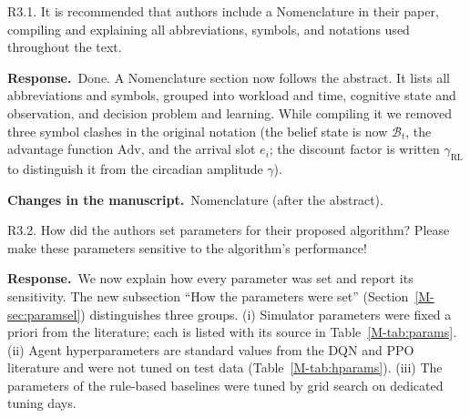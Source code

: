 \documentclass[11pt]{article}
\newcommand{\resp}{\par\smallskip\noindent\textbf{Response.}~}
\newcommand{\change}{\par\smallskip\noindent\textbf{Changes in the manuscript.}~}
\newcommand{\Sec}[1]{Section~\ref{M-#1}}
\newcommand{\Tab}[1]{Table~\ref{M-#1}}
\begin{document}
\begin{rcomment}{R3.1.}
It is recommended that authors include a Nomenclature in their paper, compiling and explaining all abbreviations, symbols, and notations used throughout the text.
\end{rcomment}
\resp Done. A Nomenclature section now follows the abstract. It lists all abbreviations and symbols, grouped into workload and time, cognitive state and observation, and decision problem and learning. While compiling it we removed three symbol clashes in the original notation (the belief state is now $\mathcal B_t$, the advantage function $\mathrm{Adv}$, and the arrival slot $e_i$; the discount factor is written $\gamma_{\mathrm{RL}}$ to distinguish it from the circadian amplitude $\gamma$).
\change Nomenclature (after the abstract).

\begin{rcomment}{R3.2.}
How did the authors set parameters for their proposed algorithm? Please make these parameters sensitive to the algorithm's performance!
\end{rcomment}
\resp We now explain how every parameter was set and report its sensitivity. The new subsection ``How the parameters were set'' (\Sec{sec:paramsel}) distinguishes three groups. (i) Simulator parameters were fixed a priori from the literature; each is listed with its source in \Tab{tab:params}. (ii) Agent hyperparameters are standard values from the DQN and PPO literature and were not tuned on test data (\Tab{tab:hparams}). (iii) The parameters of the rule-based baselines were tuned by grid search on dedicated tuning days.
\end{document}
